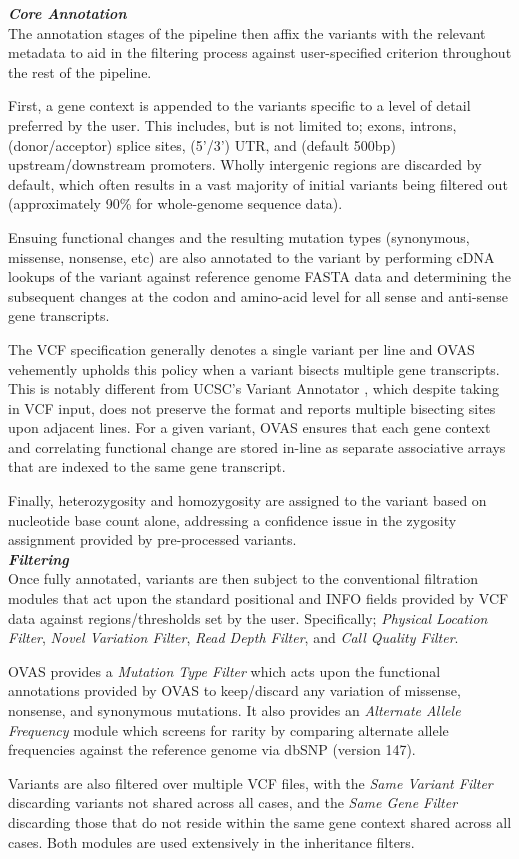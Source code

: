 \documentclass[twocolumn]{bmcart}%
\newcommand{\triplesub}[2]{\noindent\textsl{#1}\\#2\\}  %
\begin{document}
\triplesub{\bf Core Annotation}{
The annotation stages of the pipeline then affix the variants with the relevant metadata to aid in the filtering process against user-specified criterion throughout the rest of the pipeline.

First, a gene context is appended to the variants specific to a level of detail preferred by the user. This includes, but is not limited to; exons, introns, (donor/acceptor) splice sites, (5'/3') UTR, and (default 500bp) upstream/downstream promoters. Wholly intergenic regions are discarded by default, which often results in a vast majority of initial variants being filtered out (approximately 90\% for whole-genome sequence data).

Ensuing functional changes and the resulting mutation types (synonymous, missense, nonsense, etc) are also annotated to the variant by performing cDNA lookups of the variant against reference genome FASTA data and determining the subsequent changes at the codon and amino-acid level for all sense and anti-sense gene transcripts.

The VCF specification generally denotes a single variant per line and OVAS vehemently upholds this policy when a variant bisects multiple gene transcripts. This is notably different from UCSC's Variant Annotator \cite{hinrichs2016ucsc}, which despite taking in VCF input, does not preserve the format and reports multiple bisecting sites upon adjacent lines. For a given variant, OVAS ensures that each gene context and correlating functional change are stored in-line as separate associative arrays that are indexed to the same gene transcript.

Finally, heterozygosity and homozygosity are assigned to the variant based on nucleotide base count alone, addressing a confidence issue in the zygosity assignment provided by pre-processed variants.
}

\triplesub{\bf Filtering}{
Once fully annotated, variants are then subject to the conventional filtration modules that act upon the standard positional and INFO fields provided by VCF data against regions/thresholds set by the user. Specifically; \textit{Physical Location Filter}, \textit{Novel Variation Filter}, \textit{Read Depth Filter}, and \textit{Call Quality Filter}.

OVAS provides a \textit{Mutation Type Filter} which acts upon the functional annotations provided by OVAS to keep/discard any variation of missense, nonsense, and synonymous mutations. It also provides an \textit{Alternate Allele Frequency} module which screens for rarity by comparing alternate allele frequencies against the reference genome via dbSNP (version 147).

Variants are also filtered over multiple VCF files, with the \textit{Same Variant Filter} discarding variants not shared across all cases, and the \textit{Same Gene Filter} discarding those that do not reside within the same gene context shared across all cases. Both modules are used extensively in the inheritance filters.
}
\end{document}
